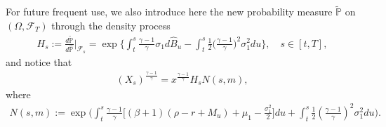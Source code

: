 \documentclass[a4paper,11pt]{amsart}
\numberwithin{equation}{section}
\begin{document}
For future frequent use, we also introduce here the new probability measure $\mathbb{\widetilde{P}}$ on $(\Omega, \mathcal{F}_T)$ through the density process
\begin{align}\label{H}
H_s:=\frac{d\mathbb{\widetilde{P}}}{d \widehat{ \mathbb{P}}}\bigg|_{\mathcal{F}_s}= \exp\bigg\{{ \int^s_t \frac{\gamma-1}{\gamma} \sigma_1 d\widehat{ B}_u - \int^s_t \frac{1}{2}\Big(\frac{\gamma-1}{\gamma}\Big)^2 \sigma_1^2 du}\bigg\}, \quad s\in[t,T],
\end{align}
and notice that 
\begin{align}\label{XN}
(X_s)^{\frac{\gamma-1}{\gamma}} = x^{\frac{\gamma-1}{\gamma}}H_s N(s,m),
\end{align}
where 
\begin{align}\label{N}
N(s,m):=  \exp \bigg( \int^s_t {\frac{\gamma-1}{\gamma}} \Big[(\beta+1)(\rho-r+M_u)+\mu_1-\frac{\sigma_1^2}{2}\Big]du + \int^s_t\frac{1}{2}(\frac{\gamma-1}{\gamma})^2 \sigma_1^2 du \bigg).
\end{align}
\end{document}
